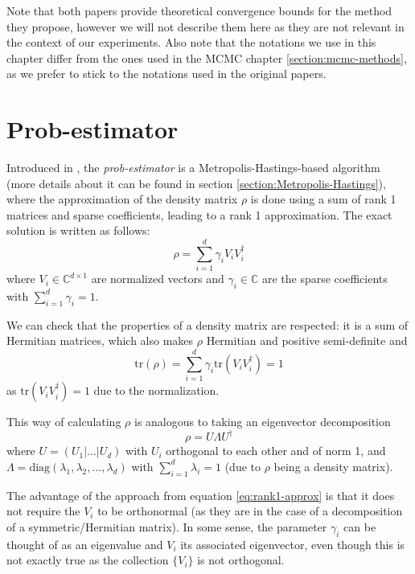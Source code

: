 \documentclass[12pt]{memoir}
\newcommand{\tr}{\text{tr}}
\begin{document}
Note that both papers provide theoretical convergence bounds for the method they propose, however we will not describe them here as they are not relevant in the context of our experiments. Also note that the notations we use in this chapter differ from the ones used in the MCMC chapter \ref{section:mcmc-methods}, as we prefer to stick to the notations used in the original papers.

\section{Prob-estimator}\label{section:prob-estimator}
Introduced in \cite{MA17}, the \textit{prob-estimator} is a Metropolis-Hastings-based algorithm (more details about it can be found in section \ref{section:Metropolis-Hastings}), where the approximation of the density matrix $\rho$ is done using a sum of rank 1 matrices and sparse coefficients, leading to a rank 1 approximation. The exact solution is written as follows:
\begin{equation}\label{eq:rank1-approx}
    \rho = \sum_{i=1}^d \gamma_i V_i V_i^\dagger
\end{equation}
where $V_i \in \mathbb{C}^{d\times 1}$ are normalized vectors and $\gamma_i \in \mathbb{C}$ are the sparse coefficients with $\sum_{i=1}^d \gamma_i = 1$.\medbreak

We can check that the properties of a density matrix are respected: it is a sum of Hermitian matrices, which also makes $\rho$ Hermitian and positive semi-definite and 
\begin{equation}
    \tr(\rho) = \sum_{i=1}^{d} \gamma_i \tr(V_i V_i^\dagger) = 1
\end{equation}
as $\tr(V_i V_i^\dagger) = 1$ due to the normalization.\medbreak

This way of calculating $\rho$ is analogous to taking an eigenvector decomposition
\begin{equation}
    \rho = U\Lambda U^\dagger
\end{equation}
where $U = (U_1|\dots|U_d)$ with $U_i$ orthogonal to each other and of norm 1, and $\Lambda = \text{diag}(\lambda_1, \lambda_2, \dots, \lambda_d)$ with $\sum_{i=1}^d \lambda_i = 1$ (due to $\rho$ being a density matrix).\medbreak

The advantage of the approach from equation \ref{eq:rank1-approx} is that it does not require the $V_i$ to be orthonormal (as they are in the case of a decomposition of a symmetric/Hermitian matrix). In some sense, the parameter $\gamma_i$ can be thought of as an eigenvalue and $V_i$ its associated eigenvector, even though this is not exactly true as the collection $\{V_i\}$ is not orthogonal. \medbreak
\end{document}
